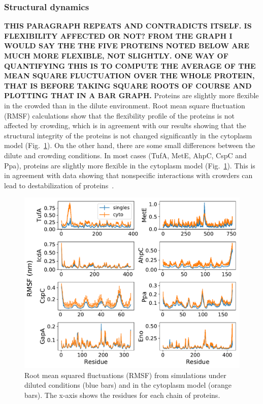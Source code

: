 \documentclass[journal=jcisd8,manuscript=article]{achemso}
\begin{document}
\subsubsection{Structural dynamics}
{\bf THIS PARAGRAPH REPEATS AND CONTRADICTS ITSELF. IS FLEXIBILITY
  AFFECTED OR NOT? FROM THE GRAPH I WOULD SAY THE THE FIVE PROTEINS
  NOTED BELOW ARE MUCH MORE FLEXIBLE, NOT SLIGHTLY. ONE WAY OF
  QUANTIFYING THIS IS TO COMPUTE THE AVERAGE OF THE MEAN SQUARE
  FLUCTUATION OVER THE WHOLE PROTEIN, THAT IS BEFORE TAKING SQUARE
  ROOTS OF COURSE AND PLOTTING THAT IN A BAR GRAPH.}  Proteins are slightly more flexible in the
crowded than in the dilute environment. Root mean square fluctuation
(RMSF) calculations show that the flexibility profile of the proteins
is not affected by crowding, which is in agreement with our results
showing that the structural integrity of the proteins is not changed
significantly in the cytoplasm model (Fig.~\ref{fig:rmsf}).  On the
other hand, there are some small differences between the dilute and
crowding conditions. In most cases (TufA, MetE, AhpC, CspC and Ppa),
proteins are slightly more flexible in the cytoplasm model
(Fig.~\ref{fig:rmsf}). This is in agreement with data showing that
nonspecific interactions with crowders can lead to destabilization of
proteins~\cite{Feig2011, miklos2011, Wang2012b}.


\begin{figure}[H]
\includegraphics[scale=0.5]{rmsf.pdf}
\caption{Root mean squared fluctuations (RMSF) from simulations under
  diluted conditions (blue bars) and in the cytoplasm model (orange
  bars). The x-axis shows the residues for each chain of proteins.}
\label{fig:rmsf}
\end{figure}
\end{document}
